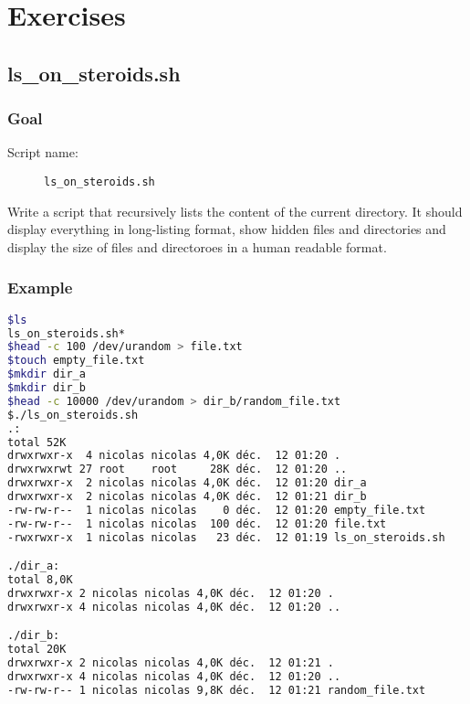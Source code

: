 \documentclass[12pt]{article}
\begin{document}
\section{Exercises}

\subsection{ls\_on\_steroids.sh}

\subsubsection{Goal}

\begin{description}
        \item[Script name:] \texttt{ls\_on\_steroids.sh}
\end{description}

Write a script that recursively lists the content of the current directory. It should display everything in long-listing format, show hidden files and directories and display the size of files and directoroes in a human readable format.

\subsubsection{Example}

\begin{lstlisting}[language=bash]
$ls
ls_on_steroids.sh*
$head -c 100 /dev/urandom > file.txt
$touch empty_file.txt
$mkdir dir_a
$mkdir dir_b
$head -c 10000 /dev/urandom > dir_b/random_file.txt
$./ls_on_steroids.sh 
.:
total 52K
drwxrwxr-x  4 nicolas nicolas 4,0K déc.  12 01:20 .
drwxrwxrwt 27 root    root     28K déc.  12 01:20 ..
drwxrwxr-x  2 nicolas nicolas 4,0K déc.  12 01:20 dir_a
drwxrwxr-x  2 nicolas nicolas 4,0K déc.  12 01:21 dir_b
-rw-rw-r--  1 nicolas nicolas    0 déc.  12 01:20 empty_file.txt
-rw-rw-r--  1 nicolas nicolas  100 déc.  12 01:20 file.txt
-rwxrwxr-x  1 nicolas nicolas   23 déc.  12 01:19 ls_on_steroids.sh

./dir_a:
total 8,0K
drwxrwxr-x 2 nicolas nicolas 4,0K déc.  12 01:20 .
drwxrwxr-x 4 nicolas nicolas 4,0K déc.  12 01:20 ..

./dir_b:
total 20K
drwxrwxr-x 2 nicolas nicolas 4,0K déc.  12 01:21 .
drwxrwxr-x 4 nicolas nicolas 4,0K déc.  12 01:20 ..
-rw-rw-r-- 1 nicolas nicolas 9,8K déc.  12 01:21 random_file.txt
\end{lstlisting}
\end{document}
